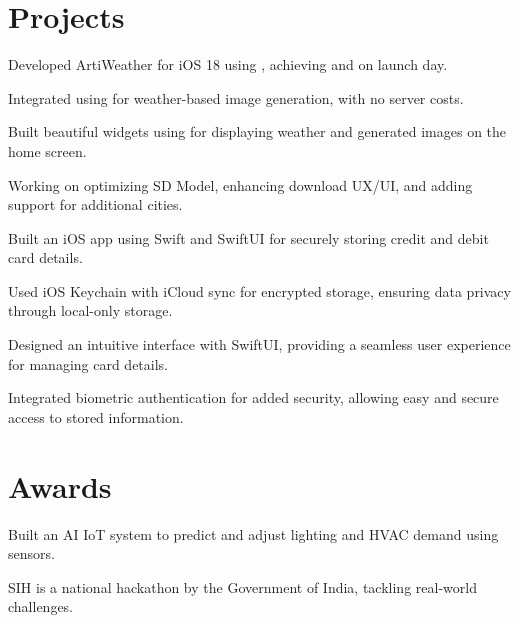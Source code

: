 \documentclass{fonts}
\begin{document}
\section{Projects}

\textbf{\href{https://apps.apple.com/app/artiweather/id6446815662}{}} 
\begin{tightemize}
    \item Developed ArtiWeather for iOS 18 using , achieving  and  on launch day.
    \item Integrated  using  for weather-based image generation, with no server costs.
    \item Built beautiful widgets using  for displaying weather and generated images on the home screen.
    \item Working on optimizing SD Model, enhancing download UX/UI, and adding support for additional cities.
\end{tightemize}
\sectionsep

\textbf{\href{https://github.com/swiftlysingh/Holder}{}} 
\begin{tightemize}
    \item Built an iOS app using Swift and SwiftUI for securely storing credit and debit card details.
    \item Used iOS Keychain with iCloud sync for encrypted storage, ensuring data privacy through local-only storage.
    \item Designed an intuitive interface with SwiftUI, providing a seamless user experience for managing card details.
    \item Integrated biometric authentication for added security, allowing easy and secure access to stored information.
\end{tightemize}


\section{Awards} 
\textbf{}
\begin{tightemize}
    \item Built an AI IoT system to predict and adjust lighting and HVAC demand using sensors.
    \item SIH is a national hackathon by the Government of India, tackling real-world challenges.
\end{tightemize}
\sectionsep
\end{document}
